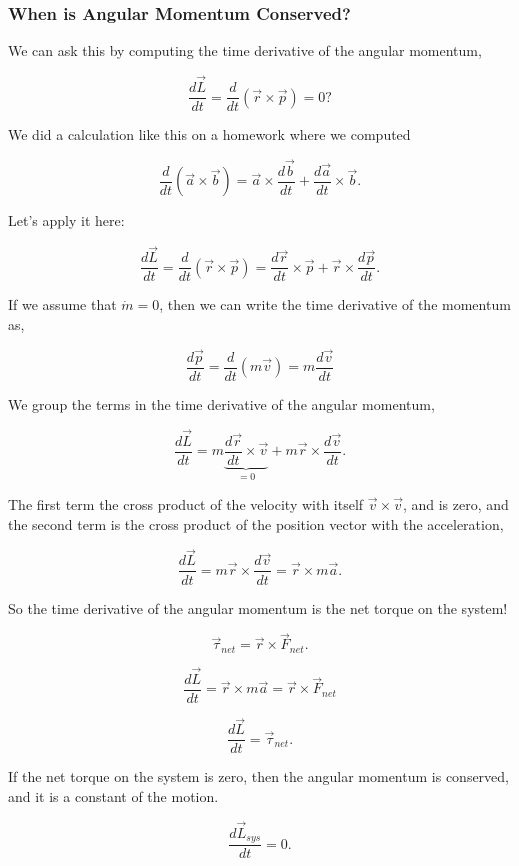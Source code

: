 \documentclass[11pt]{article}
\begin{document}
    \subsubsection{When is Angular Momentum
Conserved?}\label{when-is-angular-momentum-conserved}

We can ask this by computing the time derivative of the angular
momentum,

\[\dfrac{d\vec{L}}{dt} = \dfrac{d}{dt}\left(\vec{r} \times \vec{p}\right) = 0?\]

We did a calculation like this on a homework where we computed

\[\dfrac{d}{dt}\left(\vec{a}\times\vec{b}\right) = \vec{a}\times\dfrac{d\vec{b}}{dt} + \dfrac{d\vec{a}}{dt}\times\vec{b}.\]

Let's apply it here:

\[\dfrac{d\vec{L}}{dt} = \dfrac{d}{dt}\left(\vec{r} \times \vec{p}\right) = \dfrac{d\vec{r}}{dt} \times \vec{p} + \vec{r} \times \dfrac{d\vec{p}}{dt}.\]

If we assume that \(\dot{m}=0\), then we can write the time derivative
of the momentum as,

\[\dfrac{d\vec{p}}{dt} = \dfrac{d}{dt}\left(m\vec{v}\right) = m\dfrac{d\vec{v}}{dt}\]

We group the terms in the time derivative of the angular momentum,

\[\dfrac{d\vec{L}}{dt} = m \underbrace{\dfrac{d\vec{r}}{dt} \times \vec{v}}_{=0} + m\vec{r} \times \dfrac{d\vec{v}}{dt}.\]

The first term the cross product of the velocity with itself
\(\vec{v}\times\vec{v}\), and is zero, and the second term is the cross
product of the position vector with the acceleration,

\[\dfrac{d\vec{L}}{dt} = m\vec{r} \times \dfrac{d\vec{v}}{dt} = \vec{r}\times m\vec{a}.\]

So the time derivative of the angular momentum is the net torque on the
system!

\[\vec{\tau}_{net} = \vec{r} \times \vec{F}_{net}.\]

\[\dfrac{d\vec{L}}{dt} = \vec{r}\times m\vec{a} = \vec{r} \times \vec{F}_{net}\]

\[\dfrac{d\vec{L}}{dt} = \vec{\tau}_{net}.\]

If the net torque on the system is zero, then the angular momentum is
conserved, and it is a constant of the motion.

\[\dfrac{d\vec{L}_{sys}}{dt} = 0.\]
\end{document}

